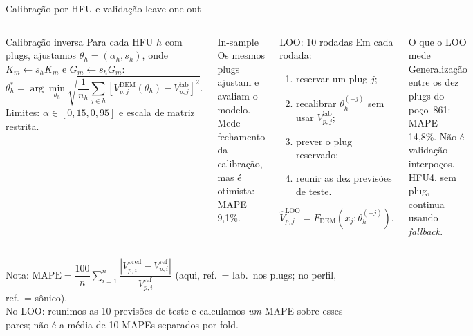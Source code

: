 \documentclass[aspectratio=169,10pt]{beamer}
\begin{document}
\begin{frame}[shrink=4]{Calibra\c{c}\~ao por HFU e valida\c{c}\~ao leave-one-out}
  \footnotesize
  \begin{columns}[T,onlytextwidth]
    \begin{block}{Calibra\c{c}\~ao inversa}
      \scriptsize
      Para cada HFU $h$ com plugs, ajustamos
      $\theta_h=(\alpha_h,s_h)$, onde
      $K_m\leftarrow s_hK_m$ e $G_m\leftarrow s_hG_m$:
      \[
        \theta_h^*=\arg\min_{\theta_h}
        \sqrt{\frac{1}{n_h}\sum_{j\in h}
        \left[V_{p,j}^{\mathrm{DEM}}(\theta_h)-V_{p,j}^{\mathrm{lab}}\right]^2}.
      \]
      Limites: $\alpha\in[0{,}15,0{,}95]$ e escala de matriz restrita.
    \end{block}
    \begin{exampleblock}{In-sample}
      \scriptsize
      Os mesmos plugs ajustam e avaliam o modelo. Mede fechamento da
      calibra\c{c}\~ao, mas \'e otimista: MAPE 9,1\%.
    \end{exampleblock}
    \begin{block}{LOO: 10 rodadas}
      \scriptsize
      Em cada rodada:
      \begin{enumerate}
        \item reservar um plug $j$;
        \item recalibrar $\theta_h^{(-j)}$ sem usar $V_{p,j}^{\mathrm{lab}}$;
        \item prever o plug reservado;
        \item reunir as dez previs\~oes de teste.
      \end{enumerate}
      \[
        \widehat{V}_{p,j}^{\mathrm{LOO}}
        =F_{\mathrm{DEM}}\!\left(x_j;\theta_h^{(-j)}\right).
      \]
    \end{block}
    \begin{exampleblock}{O que o LOO mede}
      \scriptsize
      Generaliza\c{c}\~ao entre os dez plugs do po\c{c}o~861:
      MAPE 14,8\%. N\~ao \'e valida\c{c}\~ao interpo\c{c}os.
      HFU4, sem plug, continua usando \emph{fallback}.
    \end{exampleblock}
  \end{columns}
  \vspace{0.04cm}
  {\scriptsize
  Nota:
  $\mathrm{MAPE}
  =\dfrac{100}{n}\sum_{i=1}^{n}
  \dfrac{|V_{p,i}^{\mathrm{pred}}-V_{p,i}^{\mathrm{ref}}|}
         {V_{p,i}^{\mathrm{ref}}}$
  (aqui, ref.\ = lab.\ nos plugs; no perfil, ref.\ = s\^onico).\\
  No LOO: reunimos as 10 previs\~oes de teste e calculamos
  \emph{um} MAPE sobre esses pares; n\~ao \'e a m\'edia de 10 MAPEs
  separados por fold.}
\end{frame}
\end{document}
